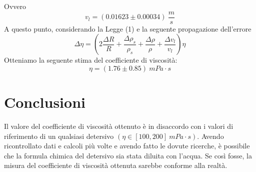 \documentclass[11pt]{article}
\begin{document}
Ovvero
\begin{equation}
    v_l = (0.01623\pm 0.00034)\ \frac{m}{s}
\end{equation}
A questo punto, considerando la Legge (1) e la seguente propagazione dell'errore
\begin{equation}
    \Delta \eta=\left( 2\frac{\Delta R}{R}+ \frac{\Delta \rho_s}{\rho_s} + \frac{\Delta \rho}{\rho}+ \frac{\Delta v_l}{v_l}\right)\eta
\end{equation}
Otteniamo la seguente stima del coefficiente di viscosità:
\begin{equation}
    \eta = (1.76\pm 0.85)\ mPa\cdot s
\end{equation}

\section{Conclusioni}
Il valore del coefficiente di viscosità ottenuto è in disaccordo con i valori di riferimento di un qualsiasi detersivo $(\eta\in[100,200]\ mPa\cdot s)$. Avendo ricontrollato dati e calcoli più volte e avendo fatto le dovute ricerche, è possibile che la formula chimica del detersivo sia stata diluita con l'acqua.
Se così fosse, la misura del coefficiente di viscosità ottenuta sarebbe conforme alla realtà.
\end{document}
